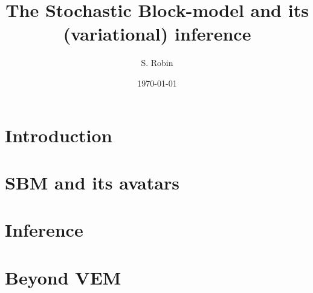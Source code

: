 \documentclass[12pt]{article}
\begin{document}

\title{The Stochastic Block-model and its (variational) inference}

\author{S. Robin}

\date{\today}

\maketitle

\abstract{}

\tableofcontents

\newpage
\section{Introduction}


\newpage
\section{SBM and its avatars}


\newpage
\section{Inference}


\newpage
\section{Beyond VEM}


\newpage
{\footnotesize


}
  

\end{document}
